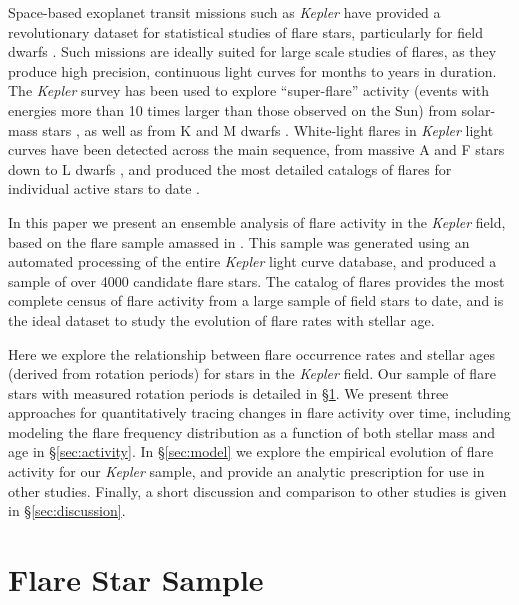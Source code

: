 \documentclass[preprint2]{aastex62}
\newcommand{\Kepler}{\textsl{Kepler}\xspace}
\begin{document}
Space-based exoplanet transit missions such as \Kepler \citep{borucki2010} have provided a revolutionary dataset for statistical studies of flare stars, particularly for field dwarfs \citep{walkowicz2011}. Such missions are ideally suited for large scale studies of flares, as they produce high precision, continuous light curves for months to years in duration.
The \Kepler survey has been used to explore ``super-flare'' activity (events with energies more than 10 times larger than those observed on the Sun) from solar-mass stars \citep{shibayama2013}, as well as from K and M dwarfs \citep{candelaresi2014}. White-light flares in \Kepler light curves have been detected across the main sequence, from massive A and F stars \citep{balona2012} down to L dwarfs \citep{gizis2013}, and produced the most detailed catalogs of flares for individual active stars to date \citep{hawley2014,davenport2014b}. 


In this paper we present an ensemble analysis of flare activity in the \Kepler field, based on the flare sample amassed in \citet{davenport2016}. This sample was generated using an automated processing of the entire \Kepler light curve database, and produced a sample of over 4000 candidate flare stars. The \citet{davenport2016} catalog of flares provides the most complete census of flare activity from a large sample of field stars to date, and is the ideal dataset to study the evolution of flare rates with stellar age.


Here we explore the relationship between flare occurrence rates and stellar ages (derived from rotation periods) for stars in the \Kepler field. Our sample of flare stars with measured rotation periods is detailed in \S\ref{sec:sample}.
We present three approaches for quantitatively tracing changes in flare activity over time, including modeling the flare frequency distribution as a function of both stellar mass and age in \S\ref{sec:activity}. In \S\ref{sec:model} we explore the empirical evolution of flare activity for our \Kepler sample, and provide an analytic prescription for use in other studies. Finally, a short discussion and comparison to other studies is given in \S\ref{sec:discussion}.




\section{Flare Star Sample}
\label{sec:sample}
\end{document}
